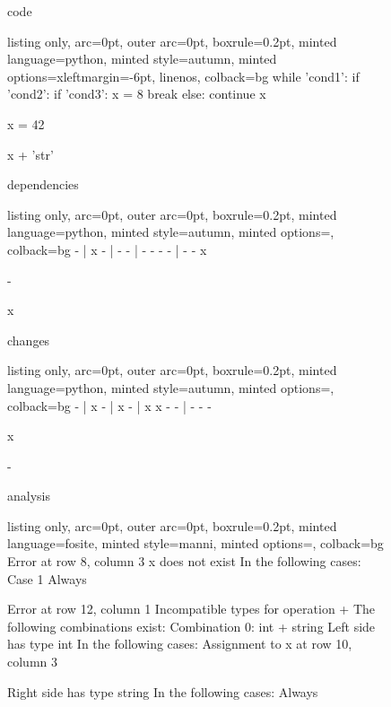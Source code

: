 \begin{figure}[!h]
 \begin{minipage}{0.32\textwidth}
 code
 \vspace{2pt}
  \begin{tcblisting}{listing only, 
    arc=0pt,
    outer arc=0pt, 
    boxrule=0.2pt,
    minted language=python,
    minted style=autumn,
    minted options={xleftmargin=-6pt, linenos},
    colback=bg }
while 'cond1':
  if 'cond2':
    if 'cond3':
      x = 8
      break
    else:
      continue
  x

  x = 42

x + 'str'
\end{tcblisting}
 \end{minipage}
 \begin{minipage}{0.32\textwidth}
 dependencies
  \begin{tcblisting}{listing only, 
    arc=0pt,
    outer arc=0pt, 
    boxrule=0.2pt,
    minted language=python,
    minted style=autumn,
    minted options={},
    colback=bg }
- | x
    - | -
        - | -
            - 
            -
        - | -
            -
    x

    -

x
\end{tcblisting}
 \end{minipage}
 \begin{minipage}{0.32\textwidth}
 changes
  \begin{tcblisting}{listing only, 
    arc=0pt,
    outer arc=0pt, 
    boxrule=0.2pt,
    minted language=python,
    minted style=autumn,
    minted options={},
    colback=bg }
 - | x
     - | x
         - | x
             x
             -
         - | -
             -
     -

     x

-
\end{tcblisting}
 \end{minipage}
 \begin{minipage}{\textwidth}
 \vspace{4pt}
 analysis
  \begin{tcblisting}{listing only, 
    arc=0pt,
    outer arc=0pt, 
    boxrule=0.2pt,
    minted language=fosite,
    minted style=manni,
    minted options={},
    colback=bg }
Error at row 8, column 3
  x does not exist
  In the following cases:
  Case 1
    Always

Error at row 12, column 1
  Incompatible types for operation +
  The following combinations exist:
  Combination 0: int + string
    Left side has type int
    In the following cases:
      Assignment to x at row 10, column 3

    Right side has type string
    In the following cases:
      Always


\end{tcblisting}
 \end{minipage}
 \label{lst:break2}
\end{figure}
